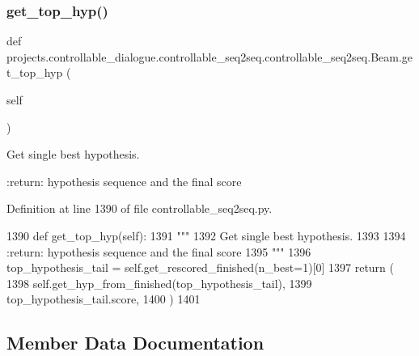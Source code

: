 \subsubsection{\texorpdfstring{get\+\_\+top\+\_\+hyp()}{get\_top\_hyp()}}
{\footnotesize\ttfamily def projects.\+controllable\+\_\+dialogue.\+controllable\+\_\+seq2seq.\+controllable\+\_\+seq2seq.\+Beam.\+get\+\_\+top\+\_\+hyp (\begin{DoxyParamCaption}\item[{}]{self }\end{DoxyParamCaption})}

\begin{DoxyVerb}Get single best hypothesis.

:return: hypothesis sequence and the final score
\end{DoxyVerb}
 

Definition at line 1390 of file controllable\+\_\+seq2seq.\+py.


\begin{DoxyCode}
1390     \textcolor{keyword}{def }get\_top\_hyp(self):
1391         \textcolor{stringliteral}{"""}
1392 \textcolor{stringliteral}{        Get single best hypothesis.}
1393 \textcolor{stringliteral}{}
1394 \textcolor{stringliteral}{        :return: hypothesis sequence and the final score}
1395 \textcolor{stringliteral}{        """}
1396         top\_hypothesis\_tail = self.get\_rescored\_finished(n\_best=1)[0]
1397         \textcolor{keywordflow}{return} (
1398             self.get\_hyp\_from\_finished(top\_hypothesis\_tail),
1399             top\_hypothesis\_tail.score,
1400         )
1401 
\end{DoxyCode}


\subsection{Member Data Documentation}
\mbox{\label{classprojects_1_1controllable__dialogue_1_1controllable__seq2seq_1_1controllable__seq2seq_1_1Beam_af5a49546e67604c1709af4769aab87ba}} 
